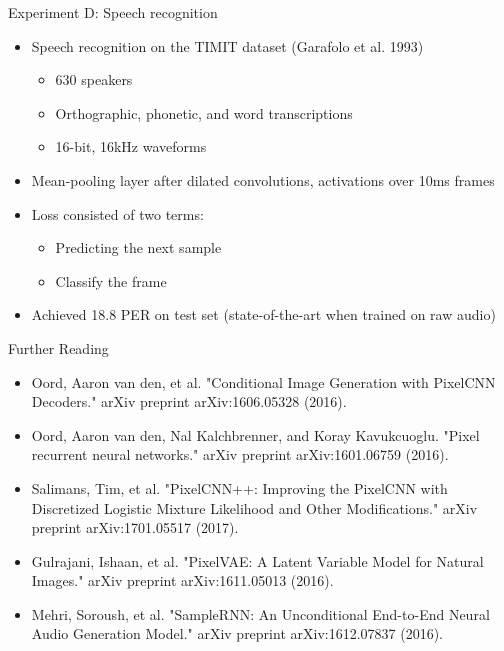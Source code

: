 \documentclass{beamer}
\begin{document}
  \begin{frame}{Experiment D: Speech recognition}

  \begin{itemize}
    \item Speech recognition on the TIMIT dataset (Garafolo et al. 1993)
      \begin{itemize}
        \item 630 speakers
        \item Orthographic, phonetic, and word transcriptions
        \item 16-bit, 16kHz waveforms
      \end{itemize}
    \item Mean-pooling layer after dilated convolutions, activations over 10ms frames
    \item Loss consisted of two terms:
      \begin{itemize}
        \item Predicting the next sample
        \item Classify the frame
      \end{itemize}

    \item Achieved 18.8 PER on test set (state-of-the-art when trained on raw audio)

  \end{itemize}

  \end{frame}

  \begin{frame}{Further Reading} 
    \begin{itemize}
      \item Oord, Aaron van den, et al. "Conditional Image Generation with PixelCNN Decoders." arXiv preprint arXiv:1606.05328 (2016).
      \item  Oord, Aaron van den, Nal Kalchbrenner, and Koray Kavukcuoglu. "Pixel recurrent neural networks." arXiv preprint arXiv:1601.06759 (2016).
        
      \item Salimans, Tim, et al. "PixelCNN++: Improving the PixelCNN with Discretized Logistic Mixture Likelihood and Other Modifications." arXiv preprint arXiv:1701.05517 (2017).
      \item Gulrajani, Ishaan, et al. "PixelVAE: A Latent Variable Model for Natural Images." arXiv preprint arXiv:1611.05013 (2016).
      \item Mehri, Soroush, et al. "SampleRNN: An Unconditional End-to-End Neural Audio Generation Model." arXiv preprint arXiv:1612.07837 (2016).
        
    \end{itemize}
  \end{frame}
\end{document}
